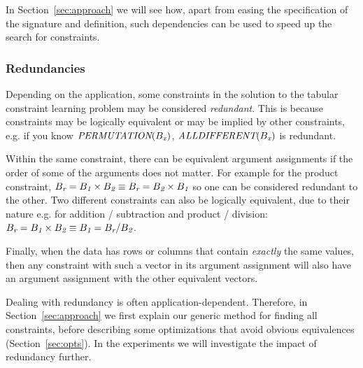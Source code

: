 In Section~\ref{sec:approach} we will see how, apart from easing the specification of the signature and definition, such dependencies can be used to speed up the search for constraints.

\subsubsection{Redundancies}
\label{sec:form:redundancies}
Depending on the application, some constraints in the solution to the tabular constraint learning problem may be considered \textit{redundant}. This is because constraints may be logically equivalent or may be implied by other constraints, e.g. if you know $\textit{PERMUTATION}(B_{\textit{x}})$, $\textit{ALLDIFFERENT}(B_{\textit{x}})$ is redundant.

Within the same constraint, there can be equivalent argument assignments if the order of some of the arguments does not matter. For example for the product constraint, $B_{\textit{r}} = B_{\textit{1}} \times B_{\textit{2}} \equiv B_{\textit{r}} = B_{\textit{2}} \times B_{\textit{1}}$ so one can be considered redundant to the other.
Two different constraints can also be logically equivalent, due to their nature e.g. for addition / subtraction and product / division: $B_{\textit{r}} = B_{\textit{1}} \times B_{\textit{2}} \equiv B_{\textit{1}} = {B_{\textit{r}}} / {B_{\textit{2}}}$.

Finally, when the data has rows or columns that contain \textit{exactly} the same values, then any constraint with such a vector in its argument assignment will also have an argument assignment with the other equivalent vectors.

Dealing with redundancy is often application-dependent.
Therefore, in Section~\ref{sec:approach} we first explain our generic method for finding all constraints, before describing some optimizations that avoid obvious equivalences (Section~\ref{sec:opts}).
In the experiments we will investigate the impact of redundancy further.

